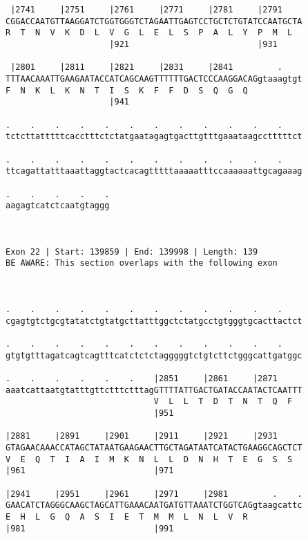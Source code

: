 \documentclass{article}
\begin{document}
\begin{Verbatim}
 |2741     |2751     |2761     |2771     |2781     |2791    
CGGACCAATGTTAAGGATCTGGTGGGTCTAGAATTGAGTCCTGCTCTGTATCCAATGCTA
R  T  N  V  K  D  L  V  G  L  E  L  S  P  A  L  Y  P  M  L  
                     |921                          |931     
  
 |2801     |2811     |2821     |2831     |2841         .    
TTTAACAAATTGAAGAATACCATCAGCAAGTTTTTTGACTCCCAAGGACAGgtaaagtgt
F  N  K  L  K  N  T  I  S  K  F  F  D  S  Q  G  Q           
                     |941                                   
  
.    .    .    .    .    .    .    .    .    .    .    .    
tctcttatttttcacctttctctatgaatagagtgacttgtttgaaataagcctttttct
                                                            
.    .    .    .    .    .    .    .    .    .    .    .    
ttcagattatttaaattaggtactcacagtttttaaaaatttccaaaaaattgcagaaag
                                                            
.    .    .    .    .
aagagtcatctcaatgtaggg
                     
                     
 
Exon 22 | Start: 139859 | End: 139998 | Length: 139
BE AWARE: This section overlaps with the following exon



.    .    .    .    .    .    .    .    .    .    .    .    
cgagtgtctgcgtatatctgtatgcttatttggctctatgcctgtgggtgcacttactct
                                                            
.    .    .    .    .    .    .    .    .    .    .    .    
gtgtgtttagatcagtcagtttcatctctctagggggtctgtcttctgggcattgatggc
                                                            
.    .    .    .    .    .    |2851     |2861     |2871     
aaatcattaatgtatttgttctttctttagGTTTTATTGACTGATACCAATACTCAATTT
                              V  L  L  T  D  T  N  T  Q  F  
                              |951                          
  
|2881     |2891     |2901     |2911     |2921     |2931     
GTAGAACAAACCATAGCTATAATGAAGAACTTGCTAGATAATCATACTGAAGGCAGCTCT
V  E  Q  T  I  A  I  M  K  N  L  L  D  N  H  T  E  G  S  S  
|961                          |971                          
  
|2941     |2951     |2961     |2971     |2981         .    .
GAACATCTAGGGCAAGCTAGCATTGAAACAATGATGTTAAATCTGGTCAGgtaagcattc
E  H  L  G  Q  A  S  I  E  T  M  M  L  N  L  V  R           
|981                          |991                          
  

\end{Verbatim}
\end{document}

